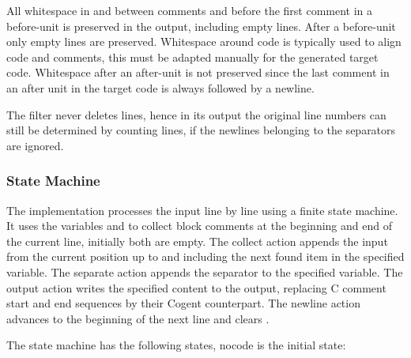 All whitespace in and between comments and before the first comment in a before-unit is preserved in the output, 
including empty lines. After a before-unit only empty lines are preserved. Whitespace around code is typically used
to align code and comments, this must be adapted manually for the generated target code. Whitespace after an after-unit
is not preserved since the last comment in an after unit in the target code is always followed by a newline.

The filter never deletes lines, hence in its output the original line numbers can still be determined by counting lines, 
if the newlines belonging to the separators are ignored.

\subsubsection{State Machine}

The implementation processes the input line by line using a finite state machine. It uses the variables  and 
 to collect block comments at the beginning and end of the current line, initially both are empty. 
The collect action appends the input from the current position up to and including the next found item in 
the specified variable. The separate action appends the separator to the specified variable. The output action 
writes the specified content to the output, replacing C comment start and end sequences by their Cogent counterpart.
The newline action advances to the beginning of the next line and clears .

The state machine has the following states, nocode is the initial state:

